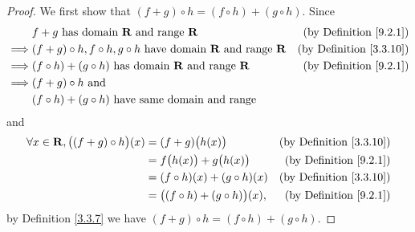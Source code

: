 \begin{proof}
    We first show that \((f + g) \circ h = (f \circ h) + (g \circ h)\).
    Since
    \begin{align*}
                 & f + g \text{ has domain } \mathbf{R} \text{ and range } \mathbf{R}                                   & \text{(by Definition \ref{9.2.1})}  \\
        \implies & (f + g) \circ h, f \circ h, g \circ h  \text{ have domain } \mathbf{R} \text{ and range } \mathbf{R} & \text{(by Definition \ref{3.3.10})} \\
        \implies & (f \circ h) + (g \circ h)  \text{ has domain } \mathbf{R} \text{ and range } \mathbf{R}              & \text{(by Definition \ref{9.2.1})}  \\
        \implies & (f + g) \circ h \text{ and }                                                                                               \\
                 & (f \circ h) + (g \circ h) \text{ have same domain and range}
    \end{align*}
    and
    \begin{align*}
        \forall x \in \mathbf{R}, \big((f + g) \circ h\big)(x) & = (f + g)\big(h(x)\big)                   & \text{(by Definition \ref{3.3.10})} \\
                                                       & = f\big(h(x)\big) + g\big(h(x)\big)       & \text{(by Definition \ref{9.2.1})}  \\
                                                       & = (f \circ h)(x) + (g \circ h)(x)         & \text{(by Definition \ref{3.3.10})} \\
                                                       & = \big((f \circ h) + (g \circ h)\big)(x), & \text{(by Definition \ref{9.2.1})}
    \end{align*}
    by Definition \ref{3.3.7} we have \((f + g) \circ h = (f \circ h) + (g \circ h)\).


\end{proof}
